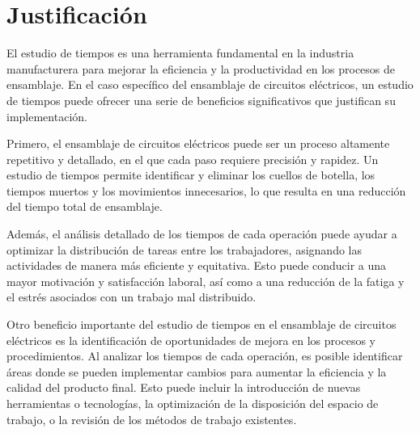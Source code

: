     \section{Justificación}
    
    El estudio de tiempos es una herramienta fundamental en la industria manufacturera para mejorar la eficiencia y la productividad en los procesos de ensamblaje. En el caso específico del ensamblaje de circuitos eléctricos, un estudio de tiempos puede ofrecer una serie de beneficios significativos que justifican su implementación.
    
    Primero, el ensamblaje de circuitos eléctricos puede ser un proceso altamente repetitivo y detallado, en el que cada paso requiere precisión y rapidez. Un estudio de tiempos permite identificar y eliminar los cuellos de botella, los tiempos muertos y los movimientos innecesarios, lo que resulta en una reducción del tiempo total de ensamblaje.
    
    Además, el análisis detallado de los tiempos de cada operación puede ayudar a optimizar la distribución de tareas entre los trabajadores, asignando las actividades de manera más eficiente y equitativa. Esto puede conducir a una mayor motivación y satisfacción laboral, así como a una reducción de la fatiga y el estrés asociados con un trabajo mal distribuido.
    
    Otro beneficio importante del estudio de tiempos en el ensamblaje de circuitos eléctricos es la identificación de oportunidades de mejora en los procesos y procedimientos. Al analizar los tiempos de cada operación, es posible identificar áreas donde se pueden implementar cambios para aumentar la eficiencia y la calidad del producto final. Esto puede incluir la introducción de nuevas herramientas o tecnologías, la optimización de la disposición del espacio de trabajo, o la revisión de los métodos de trabajo existentes.
    
    
